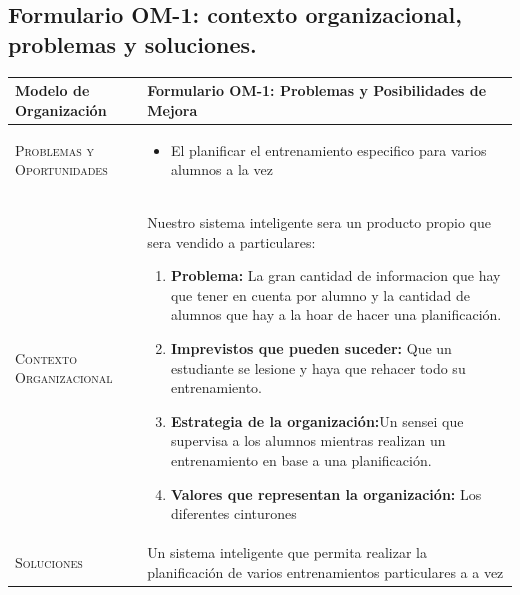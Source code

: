 \documentclass[12pt,a4paper,twoside,spanish]{article}      %
\begin{document}
        \subsection{Formulario OM-1: contexto organizacional, problemas y soluciones.}

        
            \begin{table}[H]
                \scriptsize
                \begin{tabularx}{\textwidth}{|l|X|} \hline
                    \textbf{Modelo de Organización} & \textbf{Formulario OM-1: Problemas y Posibilidades de Mejora} \\ \hline\hline
                    
                    \textsc{Problemas y Oportunidades} & 
                        \begin{itemize}
                            \item El planificar el entrenamiento especifico para varios alumnos a la vez
                        \end{itemize}\\ \hline
                    
                    \textsc{Contexto Organizacional} & Nuestro sistema inteligente sera un producto propio que sera vendido a particulares:
                     
                    \begin{enumerate}
                        \item \textbf{Problema:} La gran cantidad de informacion que hay que tener en cuenta por alumno y la cantidad de alumnos que hay a la hoar de hacer una planificación.
                        \item \textbf{Imprevistos que pueden suceder:} Que un estudiante se lesione y haya que rehacer todo su entrenamiento.
                        \item \textbf{Estrategia de la organización:}Un sensei que supervisa a los alumnos mientras realizan un entrenamiento en base a una planificación.
                        \item \textbf{Valores que representan la organización:} Los diferentes cinturones 
                    \end{enumerate}    \\ \hline
                    
                    \textsc{Soluciones} & Un sistema inteligente que permita realizar la planificación de varios entrenamientos particulares a a vez  \\ \hline
                \end{tabularx}
                  \label{tab.OM1}
            \end{table}
            
\end{document}
